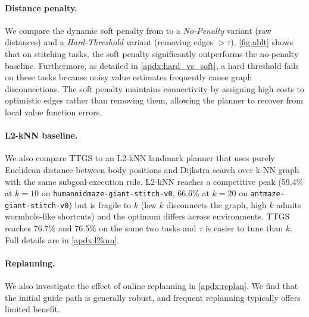 \documentclass{article} %
\begin{document}
\paragraph{Distance penalty.}
We compare the dynamic soft penalty from  to a \emph{No-Penalty} variant (raw distances) and a \emph{Hard-Threshold} variant (removing edges $>\tau$). \autoref{fig:ablt} shows that on stitching tasks, the soft penalty significantly outperforms the no-penalty baseline. Furthermore, as detailed in \autoref{apdx:hard_vs_soft}, a hard threshold fails on these tasks because noisy value estimates frequently cause graph disconnections. The soft penalty maintains connectivity by assigning high costs to optimistic edges rather than removing them, allowing the planner to recover from local value function errors.

\paragraph{L2-kNN baseline.} We also compare TTGS to an L2-kNN landmark planner that uses purely Euclidean distance between body positions and Dijkstra search over k-NN graph with the same subgoal-execution rule. L2-kNN reaches a competitive peak (59.4\% at $k{=}10$ on \texttt{humanoidmaze-giant-stitch-v0}, 66.6\% at $k{=}20$ on \texttt{antmaze-giant-stitch-v0}) but is fragile to $k$ (low $k$ disconnects the graph, high $k$ admits wormhole-like shortcuts) and the optimum differs across environments. TTGS reaches 76.7\% and 76.5\% on the same two tasks and $\tau$ is easier to tune than $k$. Full details are in \autoref{apdx:l2knn}.

\paragraph{Replanning.} We also investigate the effect of online replanning in \autoref{apdx:replan}. We find that the initial guide path is generally robust, and frequent replanning typically offers limited benefit.
\end{document}
